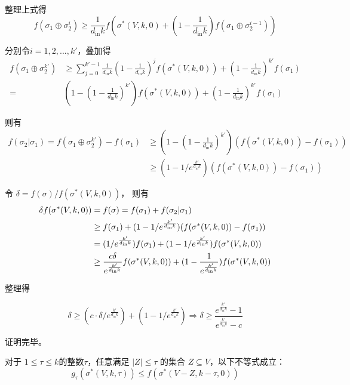 整理上式得
\begin{equation}
    f(\sigma_1 \oplus \sigma_2^i) \ge \frac{1}{d_{\text{in}}k} f(\sigma^*(V,k,0) + (1-\frac{1}{d_{\text{in}}k}) f(\sigma_1 \oplus \sigma_2^{i-1}))
\end{equation}

分别令$i= 1,2,...,k'$，叠加得
\begin{align}
    f(\sigma_1 \oplus \sigma_2^{k'}) &\ge \sum_{j=0}^{k'-1}\frac{1}{d_{\text{in}}k}(1-\frac{1}{d_{\text{in}}k})^j f(\sigma^*(V,k,0)) + (1-\frac{1}{d_{\text{in}}k})^{k'} f(\sigma_1) \\
    =& (1-(1- \frac{1}{d_{\text{in}}k})^{k'})f(\sigma^*(V,k,0)) + (1-\frac{1}{d_{\text{in}}k})^{k'} f(\sigma_1)
\end{align}

则有
\begin{align}
    f(\sigma_2 | \sigma_1) = f(\sigma_1 \oplus \sigma_2^{k'}) - f(\sigma_1) & \ge (1-(1- \frac{1}{d_{\text{in}}k})^{k'})(f(\sigma^*(V,k,0)) - f(\sigma_1)) \\
    & \ge (1-1/e^{\frac{k'}{d_{\text{in}}k}})(f(\sigma^*(V,k,0)) - f(\sigma_1))
\end{align}

令 $\delta = f(\sigma) /f(\sigma^*(V,k,0))$， 则有
\begin{align}
\small
\delta f(\sigma^*(V,k,0)) &= f(\sigma) = f(\sigma_1)+f(\sigma_2|\sigma_1) \\ &\ge f(\sigma_1) + (1-1/e^{\frac{k'}{d_{\text{in}}k}})(f(\sigma^*(V,k,0)) - f(\sigma_1)) \\
& = (1/e^{\frac{k'}{d_{\text{in}}k}}) f(\sigma_1) + (1-1/e^{\frac{k'}{d_{\text{in}}k}})f(\sigma^*(V,k,0)) \\ &\ge \frac{c\delta}{e^{\frac{k'}{d_{\text{in}}k}}} f(\sigma^*(V,k,0)) + (1-\frac{1}{e^{\frac{k'}{d_{\text{in}}k}}})f(\sigma^*(V,k,0))
\end{align}

整理得

\begin{equation}
\delta \ge (c\cdot \delta/e^{\frac{k'}{d_{\text{in}}k}}) + (1-1/e^{\frac{k'}{d_{\text{in}}k}}) \Longrightarrow
\delta \ge \frac{e^{\frac{k'}{d_{\text{in}}k}}-1}{e^{\frac{k'}{d_{\text{in}}k}}-c}
\end{equation}

\noindent 证明完毕。

\begin{lemma}
\label{lem:lem3}
对于 $1 \le \tau \le k$的整数$\tau$，任意满足 $|Z| \le \tau$ 的集合 $Z \subseteq V$，以下不等式成立：
\begin{equation}
g_\tau (\sigma^*(V,k,\tau)) \le f(\sigma^*(V-Z,k-\tau,0))
\end{equation}

\end{lemma}

